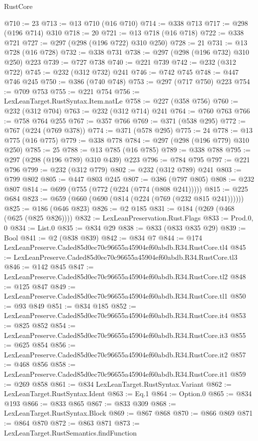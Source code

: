 \begin{lexlean}{RustCore}
\begin{coremodule}
@710 := 23
@713 := @13 @710 (@16 @710)
@714 := @338 @713
@717 := @298 (@196 @714) @310
@718 := 20
@721 := @13 @718 (@16 @718)
@722 := @338 @721
@727 := @297 (@298 (@196 @722) @310 @250)
@728 := 21
@731 := @13 @728 (@16 @728)
@732 := @338 @731
@738 := @297 (@298 (@196 @732) @310 @250) @223
@739 := @727 @738
@740 := @221 @739
@742 := @232 (@312 @722)
@745 := @232 (@312 @732) @241
@746 := @742 @745
@748 := @447 @746 @245
@750 := @386 (@740 @748)
@753 := @297 (@717 @750) @223
@754 := @709 @753
@755 := @221 @754
@756 := LexLeanTarget.RustSyntax.Item.natLe
@758 := @227 (@358 @756)
@760 := @232 (@312 @704)
@763 := @232 (@312 @714) @241
@764 := @760 @763
@766 := @758 @764 @255
@767 := @357 @766
@769 := @371 (@538 @295)
@772 := @767 (@224 (@769 @378))
@774 := @371 (@578 @295)
@775 := 24
@778 := @13 @775 (@16 @775)
@779 := @338 @778
@784 := @297 (@298 (@196 @779) @310 @250)
@785 := 25
@788 := @13 @785 (@16 @785)
@789 := @338 @788
@795 := @297 (@298 (@196 @789) @310 @439) @223
@796 := @784 @795
@797 := @221 @796
@799 := @232 (@312 @779)
@802 := @232 (@312 @789) @241
@803 := @799 @802
@805 := @447 @803 @245
@807 := @386 (@797 @805)
@808 := @232 @807
@814 := @699 (@755 (@772 (@224 (@774 (@808 @241)))))
@815 := @225 @684
@823 := @659 (@660 (@690 (@814 (@224 (@769 (@232 @815 @241))))))
@825 := @186 (@646 @823)
@826 := @2 @185
@831 := @184 (@269 (@468 (@625 (@825 @826))))
@832 := LexLeanPreservation.Rust.Flags
@833 := Prod.{0, 0}
@834 := List.{0}
@835 := @834 @29
@838 := @833 (@833 @835 @29)
@839 := Bool
@841 := @2 (@838 @839)
@842 := @834 @7
@844 := @174 LexLeanPreserve.Caded85d0ec70c96655a45904ef60abdb.R34.RustCore.tl4
@845 := LexLeanPreserve.Caded85d0ec70c96655a45904ef60abdb.R34.RustCore.tl3
@846 := @142 @845
@847 := LexLeanPreserve.Caded85d0ec70c96655a45904ef60abdb.R34.RustCore.tl2
@848 := @125 @847
@849 := LexLeanPreserve.Caded85d0ec70c96655a45904ef60abdb.R34.RustCore.tl1
@850 := @93 @849
@851 := @834 @185
@852 := LexLeanPreserve.Caded85d0ec70c96655a45904ef60abdb.R34.RustCore.it4
@853 := @825 @852
@854 := LexLeanPreserve.Caded85d0ec70c96655a45904ef60abdb.R34.RustCore.it3
@855 := @625 @854
@856 := LexLeanPreserve.Caded85d0ec70c96655a45904ef60abdb.R34.RustCore.it2
@857 := @468 @856
@858 := LexLeanPreserve.Caded85d0ec70c96655a45904ef60abdb.R34.RustCore.it1
@859 := @269 @858
@861 := @834 LexLeanTarget.RustSyntax.Variant
@862 := LexLeanTarget.RustSyntax.Ident
@863 := Eq.{1}
@864 := Option.{0}
@865 := @834 @193
@866 := @833 @865
@867 := @833 @309
@868 := LexLeanTarget.RustSyntax.Block
@869 := @867 @868
@870 := @866 @869
@871 := @864 @870
@872 := @863 @871
@873 := LexLeanTarget.RustSemantics.findFunction

\end{coremodule}
\end{lexlean}
